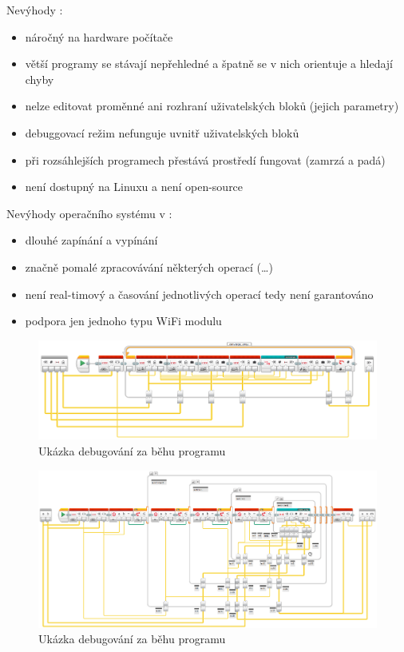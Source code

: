 Nevýhody \legoSW:
\renewcommand{\labelitemi}{$-$}
\begin{itemize}[noitemsep]\itemsep2pt
	\item náročný na hardware počítače
	\item větší programy se stávají nepřehledné a špatně se v nich orientuje a hledají chyby
	\item nelze editovat proměnné ani rozhraní uživatelských bloků (jejich parametry)
	\item debuggovací režim nefunguje uvnitř uživatelských bloků
	\item při rozsáhlejších programech přestává prostředí fungovat (zamrzá a padá)
	\item není dostupný na Linuxu a není open-source
\end{itemize}

Nevýhody operačního systému v :  %
\begin{itemize}[noitemsep]\itemsep2pt
	\item dlouhé zapínání a vypínání
	\item značně pomalé zpracovávání některých operací (\dots) %
	\item není real-timový a časování jednotlivých operací tedy není garantováno
	\item podpora jen jednoho typu WiFi modulu
\end{itemize}

\begin{figure}[h]
	\centering
	\includegraphics[width=\textwidth]{images/lego-soft/lego-soft_legolib_converge_array.png}
	\caption{Ukázka debugování za běhu programu}
	\label{fig:lego-soft_live-debuging_line-advance}
\end{figure}
\begin{figure}[h]
	\centering
	\includegraphics[width=\textwidth]{images/lego-soft/lego-soft_legolib_match_array_length.png}
	\caption{Ukázka debugování za běhu programu}
	\label{fig:lego-soft_live-debuging_line-advance}
\end{figure}



